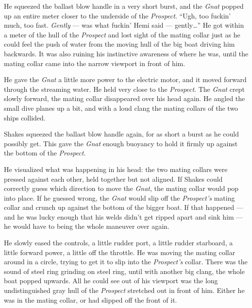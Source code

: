 \documentclass[
]{scrbook}
\begin{document}
He squeezed the ballast blow handle in a very short burst, and the
\emph{Gnat} popped up an entire meter closer to the underside of the
\emph{Prospect}. ``Ugh, too fuckin' much, too fast. \emph{Gently} ---
was what fuckin' Hemi said --- gently\ldots{}'' He got within a meter of
the hull of the \emph{Prospect} and lost sight of the mating collar just
as he could feel the push of water from the moving hull of the big boat
driving him backwards. It was also ruining his instinctive awareness of
where he was, until the mating collar came into the narrow viewport in
front of him.

He gave the \emph{Gnat} a little more power to the electric motor, and
it moved forward through the streaming water. He held very close to the
\emph{Prospect}. The \emph{Gnat} crept slowly forward, the mating collar
disappeared over his head again. He angled the small dive planes up a
bit, and with a loud clang the mating collars of the two ships collided.

Shakes squeezed the ballast blow handle again, for as short a burst as
he could possibly get. This gave the \emph{Gnat} enough buoyancy to hold
it firmly up against the bottom of the \emph{Prospect}.

He visualized what was happening in his head: the two mating collars
were pressed against each other, held together but not aligned. If
Shakes could correctly guess which direction to move the \emph{Gnat},
the mating collar would pop into place. If he guessed wrong, the
\emph{Gnat} would slip off the \emph{Prospect's} mating collar and
crunch up against the bottom of the bigger boat. If that happened ---
and he was lucky enough that his welds didn't get ripped apart and sink
him --- he would have to being the whole maneuver over again.

He slowly eased the controls, a little rudder port, a little rudder
starboard, a little forward power, a little off the throttle. He was
moving the mating collar around in a circle, trying to get it to slip
into the \emph{Prospect's} collar. There was the sound of steel ring
grinding on steel ring, until with another big clang, the whole boat
popped upwards. All he could see out of his viewport was the long
undistinguished gray hull of the \emph{Prospect} stretched out in front
of him. Either he was in the mating collar, or had slipped off the front
of it.
\end{document}
